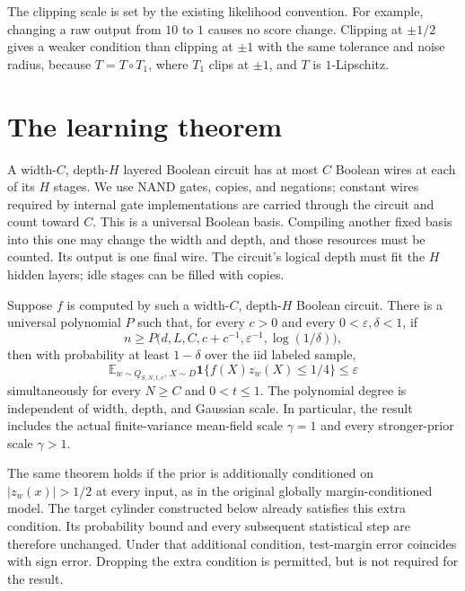 The clipping scale is set by the existing likelihood convention. For
example, changing a raw output from $10$ to $1$ causes no score change.
Clipping at $\pm1/2$ gives a weaker condition than clipping at $\pm1$ with
the same tolerance and noise radius, because
$T=T\circ T_1$, where $T_1$ clips at $\pm1$, and $T$ is $1$-Lipschitz.

\section{The learning theorem}
\label{sec:theory-main}

A width-$C$, depth-$H$ layered Boolean circuit has at most $C$ Boolean wires
at each of its $H$ stages. We use NAND gates, copies, and negations;
constant wires required by internal gate implementations are carried
through the circuit and count toward $C$. This is a universal Boolean
basis. Compiling another fixed basis into this one may change the width
and depth, and those resources must be counted. Its output is one final wire.
The circuit's logical depth must fit the $H$ hidden layers; idle stages
can be filled with copies.

\begin{theorem}
\label{thm:standalone-clipped}
Suppose $f$ is computed by such a width-$C$, depth-$H$ Boolean circuit.
There is a universal polynomial $P$ such that, for every $c>0$ and every
$0<\varepsilon,\delta<1$, if
\[
 n\ge P\bigl(d,L,C,c+c^{-1},\varepsilon^{-1},\log(1/\delta)\bigr),
\]
then with probability at least $1-\delta$ over the iid labeled sample,
\begin{equation}\label{eq:standalone-risk}
 \mathbb E_{w\sim Q_{S,N,t,c},\,X\sim D}
       \mathbf1\{f(X)z_w(X)\le1/4\}\le\varepsilon
\end{equation}
simultaneously for every $N\ge C$ and $0<t\le1$.
The polynomial degree is independent of width, depth, and Gaussian scale.
In particular, the result includes the actual finite-variance mean-field
scale $\gamma=1$ and every stronger-prior scale $\gamma>1$.
\end{theorem}

The same theorem holds if the prior is additionally conditioned on
$|z_w(x)|>1/2$ at every input, as in the original globally margin-conditioned
model. The target cylinder constructed below already satisfies this extra
condition. Its probability bound and every subsequent statistical step are
therefore unchanged. Under that additional condition, test-margin error
coincides with sign error. Dropping the extra condition is permitted, but is
not required for the result.

